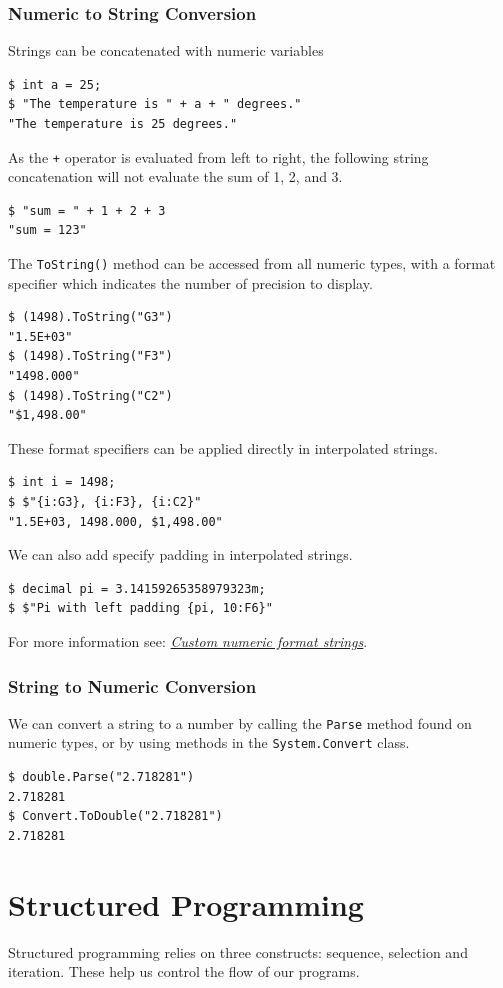 \documentclass{article}
\begin{document}
\subsubsection{Numeric to String Conversion}
Strings can be concatenated with numeric variables
\begin{lstlisting}
$ int a = 25;
$ "The temperature is " + a + " degrees."
"The temperature is 25 degrees."
\end{lstlisting}
As the \lstinline!+! operator is evaluated from left to right, the following string concatenation
will not evaluate the sum of 1, 2, and 3.
\begin{lstlisting}
$ "sum = " + 1 + 2 + 3
"sum = 123"
\end{lstlisting}
The \lstinline!ToString()! method can be accessed from all numeric types, with a
format specifier which indicates the number of precision to display.
\begin{lstlisting}
$ (1498).ToString("G3")
"1.5E+03"
$ (1498).ToString("F3")
"1498.000"
$ (1498).ToString("C2")
"$1,498.00"
\end{lstlisting}
These format specifiers can be applied directly in interpolated strings.
\begin{lstlisting}
$ int i = 1498;
$ $"{i:G3}, {i:F3}, {i:C2}"
"1.5E+03, 1498.000, $1,498.00"
\end{lstlisting}
We can also add specify padding in interpolated strings.
\begin{lstlisting}
$ decimal pi = 3.14159265358979323m;
$ $"Pi with left padding {pi, 10:F6}"
\end{lstlisting}
For more information see: \href{https://docs.microsoft.com/en-us/dotnet/standard/base-types/custom-numeric-format-strings}{\textit{Custom numeric format strings}}.
\subsubsection{String to Numeric Conversion}
We can convert a string to a number by calling the \lstinline!Parse! method found on numeric types,
or by using methods in the \lstinline!System.Convert! class.
\begin{lstlisting}
$ double.Parse("2.718281")
2.718281
$ Convert.ToDouble("2.718281")
2.718281
\end{lstlisting}
\section{Structured Programming}
Structured programming relies on three constructs: sequence, selection and iteration. 
These help us control the flow of our programs.
\end{document}
